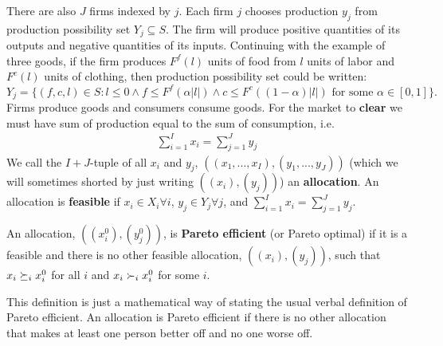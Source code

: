 There are also $J$ firms indexed by $j$. Each firm $j$ chooses
production $y_j$ from production possibility set $Y_j \subseteq
S$. The firm will produce positive quantities of its outputs and
negative quantities of its inputs. Continuing with the example of
three goods, if the firm produces $F^f(l)$ units of food from $l$
units of labor and $F^c(l)$ units of clothing, then production
possibility set could be written: 
\[ Y_j = \{ (f,c,l) \in S: l \leq 0 \wedge f \leq F^f(\alpha |l|)
\wedge c \leq F^c((1-\alpha) |l|) \text{ for some } \alpha \in
[0,1]\}. \] 
Firms produce goods and consumers consume goods. For the market to
\textbf{clear} we must have sum of production equal to the sum of
consumption, 
i.e. 
\begin{align*}
  \sum_{i=1}^I x_i = \sum_{j=1}^J y_j \label{eq:mc}
\end{align*}
We call the $I+J$-tuple of all $x_i$ and $y_j$, $\left( (x_1,..., x_I)
  , (y_1, ..., y_J) \right)$ (which we will sometimes shorted by just
writing $((x_i),(y_j))$) an \textbf{allocation}. An allocation is
\textbf{feasible} if $x_i \in X_i \forall i$, $y_j \in Y_j \forall j$,
and $ \sum_{i=1}^I x_i = \sum_{j=1}^J y_j$.
\begin{definition}
  An allocation, $((x_i^0),(y_j^0))$, is \textbf{Pareto efficient} (or
  Pareto optimal) if it is a feasible and there is no other feasible
  allocation, $((x_i),(y_j))$, such that $x_i \succeq_i x_i^0$ for all
  $i$ and $x_i \succ_i x_i^0$ for some $i$.
\end{definition}
This definition is just a mathematical way of stating the usual verbal
definition of Pareto efficient. An allocation is Pareto efficient if
there is no other allocation that makes at least one person better off
and no one worse off. 

